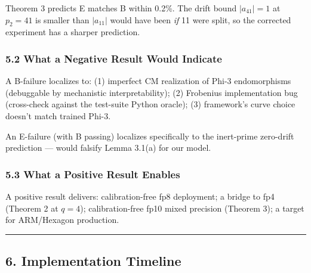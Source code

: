 \documentclass[
  11pt,
]{article}
\begin{document}
Theorem 3 predicts E matches B within 0.2\%. The drift bound
\(|a_{41}| = 1\) at \(p_2 = 41\) is smaller than \(|a_{11}|\) would have
been \emph{if} 11 were split, so the corrected experiment has a sharper
prediction.

\hypertarget{what-a-negative-result-would-indicate}{%
\subsubsection{5.2 What a Negative Result Would
Indicate}\label{what-a-negative-result-would-indicate}}

A B-failure localizes to: (1) imperfect CM realization of Phi-3
endomorphisms (debuggable by mechanistic interpretability); (2)
Frobenius implementation bug (cross-check against the test-suite Python
oracle); (3) framework's curve choice doesn't match trained Phi-3.

An E-failure (with B passing) localizes specifically to the inert-prime
zero-drift prediction --- would falsify Lemma 3.1(a) for our model.

\hypertarget{what-a-positive-result-enables}{%
\subsubsection{5.3 What a Positive Result
Enables}\label{what-a-positive-result-enables}}

A positive result delivers: calibration-free fp8 deployment; a bridge to
fp4 (Theorem 2 at \(q = 4\)); calibration-free fp10 mixed precision
(Theorem 3); a target for ARM/Hexagon production.

\begin{center}\rule{0.5\linewidth}{0.5pt}\end{center}

\hypertarget{implementation-timeline}{%
\subsection{6. Implementation Timeline}\label{implementation-timeline}}
\end{document}
